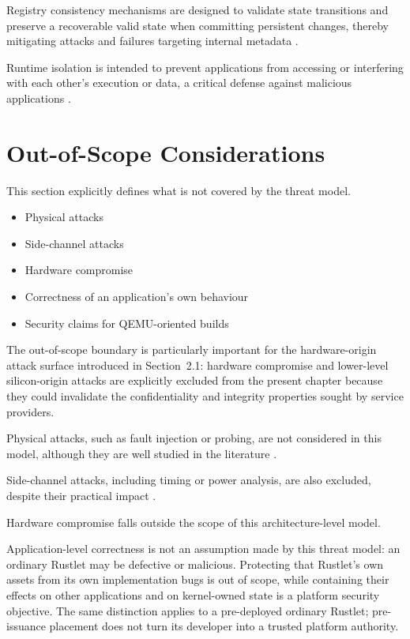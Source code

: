 Registry consistency mechanisms are designed to validate state transitions and
preserve a recoverable valid state when committing persistent changes, thereby
mitigating attacks and failures targeting internal metadata
\cite{munoz2023tee}.

Runtime isolation is intended to prevent applications from accessing or
interfering with each other's execution or data, a critical defense against
malicious applications \cite{busch2020trustedcore}.

\section{Out-of-Scope Considerations}

This section explicitly defines what is not covered by the threat model.

\begin{itemize}
\item Physical attacks
\item Side-channel attacks
\item Hardware compromise
\item Correctness of an application's own behaviour
\item Security claims for QEMU-oriented builds
\end{itemize}

The out-of-scope boundary is particularly important for the hardware-origin
attack surface introduced in Section~2.1: hardware compromise and lower-level
silicon-origin attacks are explicitly excluded from the present chapter because
they could invalidate the confidentiality and integrity properties sought by
service providers.

Physical attacks, such as fault injection or probing, are not considered in
this model, although they are well studied in the literature
\cite{boneh1997faults}.

Side-channel attacks, including timing or power analysis, are also excluded,
despite their practical impact \cite{kocher1996timing, kocher1999dpa}.

Hardware compromise falls outside the scope of this architecture-level model.

Application-level correctness is not an assumption made by this threat model:
an ordinary Rustlet may be defective or malicious. Protecting that Rustlet's
own assets from its own implementation bugs is out of scope, while containing
their effects on other applications and on kernel-owned state is a platform
security objective. The same distinction applies to a pre-deployed ordinary
Rustlet; pre-issuance placement does not turn its developer into a trusted
platform authority.

